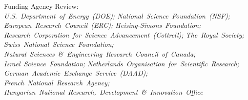 \item \raggedright Funding Agency Review: \\ \textit{\nohyphens{U.S.~Department~of~Energy~(DOE); National~Science~Foundation~(NSF); European~Research~Council~(ERC); Heising-Simons~Foundation; Research~Corporation~for~Science~Advancement~(Cottrell); The~Royal~Society; Swiss~National~Science~Foundation; Natural~Sciences~\&~Engineering~Research~Council~of~Canada; Israel~Science~Foundation; Netherlands~Organisation~for~Scientific~Research; German~Academic~Exchange~Service~(DAAD); French~National~Research~Agency; Hungarian~National~Research,~Development~\&~Innovation~Office}}

